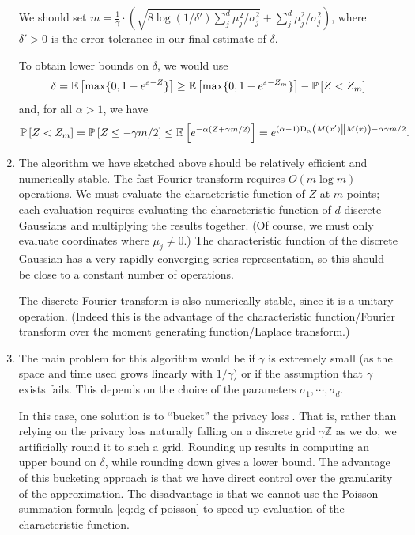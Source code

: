 \documentclass{jpcfinal} %
\newcommand{\ex}[2]{{\ifx&#1& \mathbb{E} \else
\underset{#1}{\mathbb{E}} \fi \left[#2\right]}}
\newcommand{\pr}[2]{{\ifx&#1& \mathbb{P} \else
\underset{#1}{\mathbb{P}} \fi \left[#2\right]}}
\newcommand{\dr}[3]{\mathrm{D}_{#1}\left(#2\middle\|#3\right)}
\newcommand{\eps}{\varepsilon}
\newcommand{\Z}{\mathbb{Z}}
\begin{document}
\begin{enumerate}
    We should set $m=\frac{1}{\gamma} \cdot \left(\sqrt{8 \log(1/\delta') \sum_j^d \mu_j^2/\sigma_j^2} + \sum_j^d \mu_j^2/\sigma_j^2\right)$, where $\delta'>0$ is the error tolerance in our final estimate of $\delta$.
    
    To obtain lower bounds on $\delta$, we would use 
    \begin{equation}
        \delta = \ex{}{\max\{0,1-e^{\eps-Z}\}} \ge \ex{}{\max\{0,1-e^{\eps-Z_m}\}} - \pr{}{Z<Z_m}
    \end{equation} 
    and, for all $\alpha>1$, we have 
    \begin{equation}
        \pr{}{Z<Z_m} = \pr{}{Z \le -\gamma m / 2} \le \ex{}{e^{-\alpha(Z + \gamma m / 2)}} = e^{(\alpha-1)\dr{\alpha}{M(x')}{M(x)} - \alpha\gamma m / 2}.
    \end{equation}
    
    \item The algorithm we have sketched above should be relatively efficient and numerically stable. The fast Fourier transform requires $O(m \log m)$ operations. We must evaluate the characteristic function of $Z$ at $m$ points; each evaluation requires evaluating the characteristic function of $d$ discrete Gaussians and multiplying the results together. (Of course, we must only evaluate coordinates where $\mu_j \ne 0$.) The characteristic function of the discrete Gaussian has a very rapidly converging series representation, so this should be close to a constant number of operations.
    
    The discrete Fourier transform is also numerically stable, since it is a unitary operation. (Indeed this is the advantage of the characteristic function/Fourier transform over the moment generating function/Laplace transform.)
    
    \item The main problem for this algorithm would be if $\gamma$ is extremely small (as the space and time used grows linearly with $1/\gamma$) or if the assumption that $\gamma$ exists fails. This depends on the choice of the parameters $\sigma_1, \cdots, \sigma_d$.
    
    In this case, one solution is to ``bucket'' the privacy loss \citep{KoskelaJPH20,GoogleComposition}. That is, rather than relying on the privacy loss naturally falling on a discrete grid $\gamma \Z$ as we do, we artificially round it to such a grid. Rounding up results in computing an upper bound on $\delta$, while rounding down gives a lower bound. The advantage of this bucketing approach is that we have direct control over the granularity of the approximation. The disadvantage is that we cannot use the Poisson summation formula \eqref{eq:dg-cf-poisson} to speed up evaluation of the characteristic function.
    
 \end{enumerate}
\end{document}
